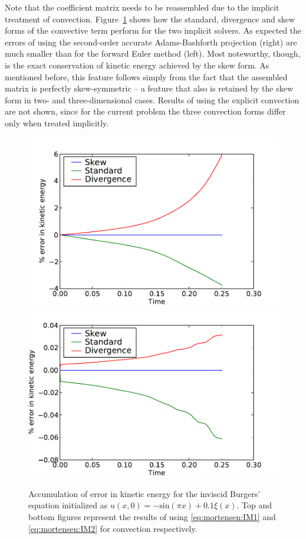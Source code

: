 Note that the coefficient matrix  needs
to be reassembled due to the implicit treatment of
convection. Figure~\ref{fig:mortensen:burgers_KE} shows how the standard,
divergence and skew forms of the convective term perform for the two
implicit solvers. As expected the errors of using the second-order
accurate Adams-Bashforth projection (right) are much smaller than for
the forward Euler method (left). Most noteworthy, though, is the exact
conservation of kinetic energy achieved by the skew form.
As mentioned before, this feature follows simply from the fact that
the assembled matrix  is perfectly skew-symmetric -- a feature
that also is retained by the skew form in two- and three-dimensional
cases. Results of using the explicit convection are not shown, since
for the current problem the three convection forms differ only when
treated implicitly.

\begin{figure}
  \centering
  \includegraphics[width=\twofigs]{chapters/mortensen/pdf/Burgers_KE_IM1.pdf}
  \includegraphics[width=\twofigs]{chapters/mortensen/pdf/Burgers_KE_IM2.pdf}
  \caption{ Accumulation of error in kinetic energy for the inviscid
    Burgers' equation initialized as $u(x,0)=-\text{sin}(\pi x)+0.1
    \xi(x)$. Top and bottom figures represent the results of using
    \eqref{eq:mortensen:IM1} and \eqref{eq:mortensen:IM2} for
    convection respectively. }
  \label{fig:mortensen:burgers_KE}
\end{figure}

